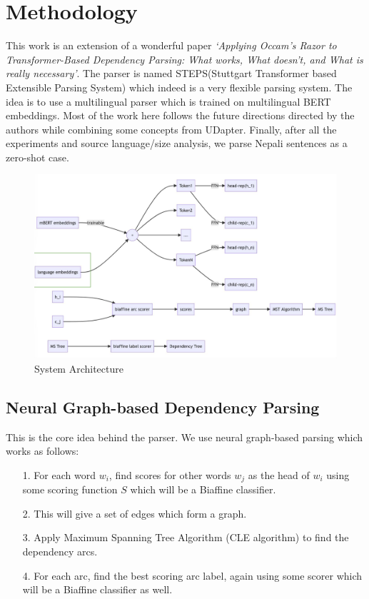 \chapter{Methodology}
This work is an extension of a wonderful paper \textit{`Applying Occam's Razor
to Transformer-Based Dependency Parsing: What works, What doesn't, and What is
really necessary'}\cite{steps-parser}. The parser is named STEPS(Stuttgart
Transformer based Extensible Parsing System) which indeed is a very flexible
parsing system. The idea is to use a multilingual parser which is trained on
multilingual BERT embeddings. Most of the work here follows the future
directions directed by the authors\cite{steps-parser} while combining some
concepts from UDapter\cite{udapter}. Finally, after all the experiments and
source language/size analysis, we parse Nepali sentences as a zero-shot case.

\begin{figure}[!h]
    \center
    \includegraphics[scale=0.25]{images/Thesis_Architecture}
    \caption{System Architecture}
    \label{system_architecture}
\end{figure}

\section{Neural Graph-based Dependency Parsing}
This is the core idea behind the parser. We use neural graph-based parsing which works as follows:
\begin{itemize}
    \item[1.] For each word $w_i$, find scores for other words $w_j$ as the head of $w_i$ using some scoring function $S$ which will be a Biaffine classifier.
    \item[2.] This will give a set of edges which form a graph.
    \item[3.] Apply Maximum Spanning Tree Algorithm (CLE algorithm) to find the dependency arcs.
    \item[4.] For each arc, find the best scoring arc label, again using some scorer which will be a Biaffine classifier as well.
\end{itemize}

